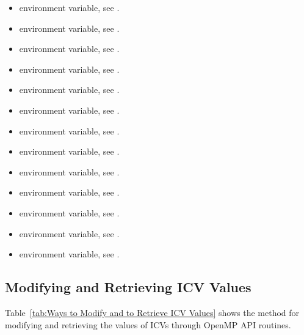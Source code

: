 \crossreferences
\begin{itemize}
\item {} environment variable, see .

\item {} environment variable, see .

\item {} environment variable, see .

\item {} environment variable, see .

\item {} environment variable, see .

\item {} environment variable, see .

\item {} environment variable, see . 

\item {} environment variable, see . 

\item {} environment variable, see .

\item {} environment variable, see .

\item {} environment variable, see .

\item {} environment variable, see .

\item {} environment variable, see .
\end{itemize}








\subsection{Modifying and Retrieving ICV Values}
\label{subsec:Modifying and Retrieving ICV Values}
Table~\ref{tab:Ways to Modify and to Retrieve ICV Values} shows the method for modifying and retrieving the values of ICVs 
through OpenMP API routines.

